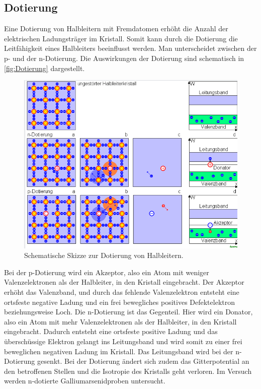 \subsection{Dotierung}
\label{sub:Dotierung}

Eine Dotierung von Halbleitern mit Fremdatomen erhöht die Anzahl der elektrischen Ladungsträger im Kristall.
Somit kann durch die Dotierung die Leitfähigkeit eines Halbleiters beeinflusst werden.
Man unterscheidet zwischen der p- und der n-Dotierung. Die Auswirkungen der Dotierung sind schematisch in \autoref{fig:Dotierung} dargestellt.
\begin{figure}[H]
    \centering
    \includegraphics[scale=0.45]{Abbildungen/Dotierung.png}
    \caption{Schematische Skizze zur Dotierung von Halbleitern.\cite{Dotierung}}
    \label{fig:Dotierung}
\end{figure}
Bei der p-Dotierung wird ein Akzeptor, also ein Atom mit weniger Valenzelektronen als der Halbleiter, in den Kristall eingebracht.
Der Akzeptor erhöht das Valenzband, und durch das fehlende Valenzelektron entsteht eine ortsfeste negative Ladung und ein frei bewegliches
positives Defektelektron beziehungsweise Loch.
Die n-Dotierung ist das Gegenteil. Hier wird ein Donator, also ein Atom mit mehr Valenzelektronen als der Halbleiter, in den Kristall eingebracht.
Dadurch entsteht eine ortsfeste positive Ladung und das überschüssige Elektron gelangt ins Leitungsband und wird somit zu einer frei beweglichen
negativen Ladung im Kristall. Das Leitungsband wird bei der n-Dotierung gesenkt.
Bei der Dotierung ändert sich zudem das Gitterpotential an den betroffenen Stellen und die Isotropie des Kristalls geht verloren.
Im Versuch werden n-dotierte Galliumarsenidproben untersucht.



